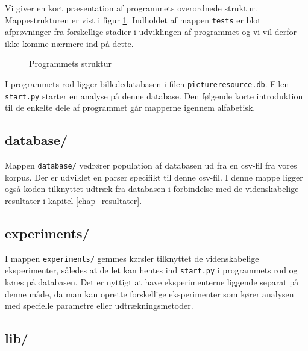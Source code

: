 {
{\sffamily Vi giver en kort præsentation af programmets overordnede
struktur. Mappestrukturen er vist i figur \ref{program_struktur}.
Indholdet af mappen \texttt{tests} er blot afprøvninger fra forskellige
stadier i udviklingen af programmet og vi vil derfor ikke komme nærmere
ind på dette.

\begin{figure}[!h]
    \caption[]{Programmets struktur}
    \label{program_struktur}
\end{figure}

I programmets rod ligger billededatabasen i filen
\texttt{pictureresource.db}. Filen \texttt{start.py} starter en analyse
på denne database. Den følgende korte introduktion til de enkelte dele
af programmet går mapperne igennem alfabetisk.

}

\subsection{database/}
\vspace{1.2em}
Mappen \texttt{database/} vedrører population af databasen ud fra en
csv-fil fra vores korpus. Der er udviklet en parser specifikt til denne
csv-fil. I denne mappe ligger også koden tilknyttet udtræk fra databasen
i forbindelse med de videnskabelige resultater i kapitel
\ref{chap_resultater}.

\subsection{experiments/}
\vspace{1.2em}

I mappen \texttt{experiments/} gemmes kørsler tilknyttet de
videnskabelige eksperimenter, således at de let kan hentes ind
\texttt{start.py} i programmets rod og køres på databasen. Det er
nyttigt at have eksperimenterne liggende separat på denne måde, da man
kan oprette forskellige eksperimenter som kører analysen med specielle
parametre eller udtrækningsmetoder.

\subsection{lib/}
\vspace{1.2em}

}

